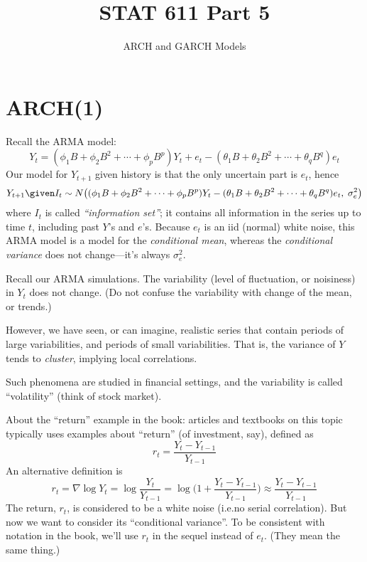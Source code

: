 \documentclass[12pt]{article}
\begin{document}
\title{STAT 611 Part 5}
\subtitle{ARCH and GARCH Models}
\maketitle

\section{ARCH(1)}

Recall the ARMA model:
\[
Y_t
= (\phi_1 B + \phi_2B^2 + \dotsb + \phi_pB^p) Y_t
  + e_t
  -
  (\theta_1B + \theta_2B^2 +\dotsb + \theta_qB^q) e_t
\]
Our model for $Y_{t+1}$ given history is
that the only uncertain part is $e_t$, hence
\[
Y_{t+1} \given I_t
\sim N\bigl(
  (\phi_1 B + \phi_2B^2 + \dotsb + \phi_pB^p) Y_t
  -
  (\theta_1B + \theta_2B^2 +\dotsb + \theta_qB^q) e_t,
  \;
  \sigma_e^2
  \bigr)
\]
where $I_t$ is called \emph{``information set''};
it contains all information in the series up to time $t$,
including past $Y$'s and $e$'s.
Because $e_t$ is an iid (normal) white noise,
this ARMA model is a model for the \emph{conditional mean},
whereas the \emph{conditional variance} does not change---it's always
$\sigma^2_e$.

Recall our ARMA simulations.
The variability (level of fluctuation, or noisiness) in $Y_t$
does not change.
(Do not confuse the variability with change of the mean, or trends.)

However,
we have seen, or can imagine,
realistic series that contain periods of large variabilities,
and periods of small variabilities.
That is, the variance of $Y$ tends to \emph{cluster},
implying local correlations.

Such phenomena are studied in financial settings,
and the variability is called ``volatility'' (think of stock market).

\alert About the ``return'' example in the book:
articles and textbooks on this topic typically uses
examples about ``return'' (of investment, say), defined as
\[
r_t = \frac{Y_t - Y_{t-1}}{Y_{t-1}}
\]
An alternative definition is
\[
r_t
= \nabla \log Y_t
= \log \frac{Y_t}{Y_{t-1}}
= \log \biggl(1 + \frac{Y_t - Y_{t-1}}{Y_{t-1}}\biggr)
\approx \frac{Y_t - Y_{t-1}}{Y_{t-1}}
\]
The return, $r_t$, is considered to be a white noise
(i.e.\@ no serial correlation).
But now we want to consider its ``conditional variance''.
To be consistent with notation in the book,
we'll use $r_t$ in the sequel instead of $e_t$.
(They mean the same thing.)
\end{document}

